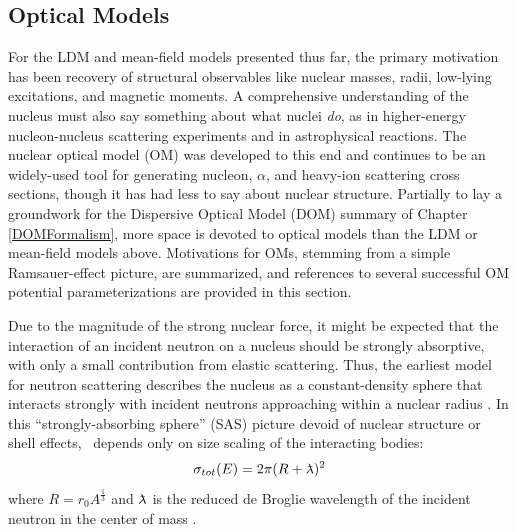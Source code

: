 \subsection{Optical Models}
For the LDM and mean-field models presented thus far, the primary motivation has been recovery
of structural observables like nuclear masses, radii, low-lying excitations, and magnetic moments. 
A comprehensive understanding of the nucleus must also say something about what
nuclei \textit{do}, as in higher-energy nucleon-nucleus scattering experiments
and in astrophysical reactions.
The nuclear optical model (OM) was developed to this end and continues to be an
widely-used tool for generating nucleon, $\alpha$, and heavy-ion scattering
cross sections, though it has had less to say about nuclear structure. Partially to lay a groundwork
for the Dispersive Optical Model (DOM) summary of Chapter \ref{DOMFormalism}, more space is devoted
to optical models than the LDM or mean-field models above. Motivations for OMs, stemming from a
simple Ramsauer-effect picture, are
summarized, and references to several successful OM potential parameterizations
are provided in this section.

Due to the magnitude of the strong nuclear force, it might be expected that 
the interaction of an incident neutron on a nucleus should be strongly
absorptive, with only a small contribution from elastic scattering. Thus, the
earliest model for neutron scattering describes the nucleus as a constant-density
sphere that interacts strongly with incident neutrons approaching within a nuclear radius
\cite{Feshbach1949}. In this ``strongly-absorbing sphere'' (SAS) picture devoid of nuclear structure
or shell effects, \tot\ depends only on size scaling of the interacting bodies:
\begin{equation} \label{SASAbsolute}
    \sigma_{tot}(E) = 2\pi(R + \lambdabar)^{2}
\end{equation}
where $R=r_{0}A^{\frac{1}{3}}$ and $\lambdabar$ is the reduced de Broglie wavelength
of the incident neutron in the center of mass \cite{Fernbach1949, Satchler1980}. 

